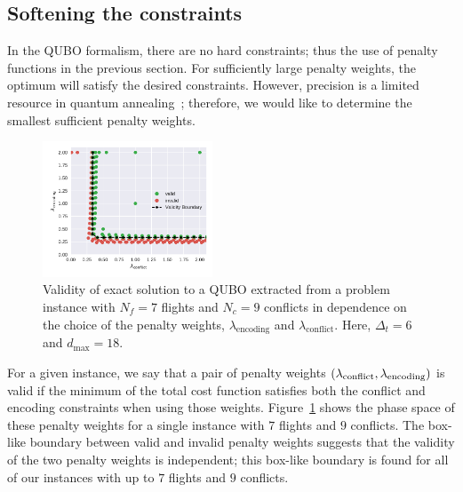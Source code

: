 \subsection{Softening the constraints}
In the QUBO formalism, there are no hard constraints; thus the use of penalty functions in the previous section.
For sufficiently large penalty weights, the optimum will satisfy the desired constraints.
However, precision is a limited resource in quantum annealing~\cite{TODO:D-Wave-precision}; therefore, we would like to determine the smallest sufficient penalty weights.

\begin{figure}[h]
\centering
\includegraphics[width=0.45\textwidth]{./pics/validity_boundary_example.pdf}
\caption[Penalty weight phase diagram]{Validity of exact solution to a QUBO extracted from a problem instance with $N_f=7$ flights and $N_c=9$ conflicts in dependence on the choice of the penalty weights, $\lambda_\text{encoding}$ and $\lambda_\text{conflict}$. Here, $\Delta_t=6$ and $d_\text{max}=18$.}
\label{fig:penalty_weights}
\end{figure}

For a given instance, we say that a pair of penalty weights $(\lambda_{\mathrm{conflict}}, \lambda_{\mathrm{encoding}})$ is valid if the minimum of the total cost function satisfies both the conflict and encoding constraints when using those weights.
Figure~\ref{fig:penalty_weights} shows the phase space of these penalty weights for a single instance with $7$ flights and $9$ conflicts.
The box-like boundary between valid and invalid penalty weights suggests that the validity of the two penalty weights is independent; 
this box-like boundary is found for all of our instances with up to $7$ flights and $9$ conflicts.

